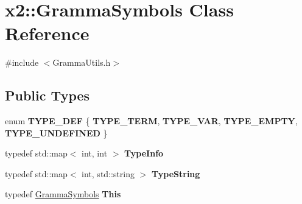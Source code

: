 \hypertarget{classx2_1_1_gramma_symbols}{}\section{x2\+:\+:Gramma\+Symbols Class Reference}
\label{classx2_1_1_gramma_symbols}


{\ttfamily \#include $<$Gramma\+Utils.\+h$>$}

\subsection*{Public Types}
\begin{DoxyCompactItemize}
\item 
\mbox{\label{classx2_1_1_gramma_symbols_aa2d271a9d4d8adb95a97f45c743ad322}} 
enum {\bfseries T\+Y\+P\+E\+\_\+\+D\+EF} \{ {\bfseries T\+Y\+P\+E\+\_\+\+T\+E\+RM}, 
{\bfseries T\+Y\+P\+E\+\_\+\+V\+AR}, 
{\bfseries T\+Y\+P\+E\+\_\+\+E\+M\+P\+TY}, 
{\bfseries T\+Y\+P\+E\+\_\+\+U\+N\+D\+E\+F\+I\+N\+ED}
 \}
\item 
\mbox{\label{classx2_1_1_gramma_symbols_a88f776185c38f99d90dfe88faf406486}} 
typedef std\+::map$<$ int, int $>$ {\bfseries Type\+Info}
\item 
\mbox{\label{classx2_1_1_gramma_symbols_ac78d9a23d6a926093a2269d5f4fddc2c}} 
typedef std\+::map$<$ int, std\+::string $>$ {\bfseries Type\+String}
\item 
\mbox{\label{classx2_1_1_gramma_symbols_a3e471289e4e8bdf147e0e12b0f283ce6}} 
typedef \hyperlink{classx2_1_1_gramma_symbols}{Gramma\+Symbols} {\bfseries This}
\end{DoxyCompactItemize}
